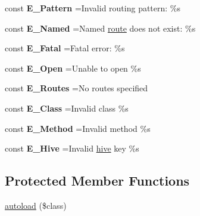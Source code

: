 {\bf }\par
\begin{DoxyCompactItemize}
\item 
\hypertarget{class_base_a2a8c25f4fb29d11d273ea8b7cc678a10}{}\label{class_base_a2a8c25f4fb29d11d273ea8b7cc678a10} 
const {\bfseries E\+\_\+\+Pattern} =\textquotesingle{}Invalid routing pattern\+: \%s\textquotesingle{}
\item 
\hypertarget{class_base_ab7eb7301d76ada1832c7dfd106ee7413}{}\label{class_base_ab7eb7301d76ada1832c7dfd106ee7413} 
const {\bfseries E\+\_\+\+Named} =\textquotesingle{}Named \hyperlink{class_base_a369026a3cb8f321eadc19535ee308b2d}{route} does not exist\+: \%s\textquotesingle{}
\item 
\hypertarget{class_base_a317619c968fa68a4a7704384d9f4efda}{}\label{class_base_a317619c968fa68a4a7704384d9f4efda} 
const {\bfseries E\+\_\+\+Fatal} =\textquotesingle{}Fatal error\+: \%s\textquotesingle{}
\item 
\hypertarget{class_base_a0bbe3ee05726cd755830674390571869}{}\label{class_base_a0bbe3ee05726cd755830674390571869} 
const {\bfseries E\+\_\+\+Open} =\textquotesingle{}Unable to open \%s\textquotesingle{}
\item 
\hypertarget{class_base_a0a15c5ad9084c1fd577c494e4b1d4b52}{}\label{class_base_a0a15c5ad9084c1fd577c494e4b1d4b52} 
const {\bfseries E\+\_\+\+Routes} =\textquotesingle{}No routes specified\textquotesingle{}
\item 
\hypertarget{class_base_a98d5554d5113e4daf97d5496887942dd}{}\label{class_base_a98d5554d5113e4daf97d5496887942dd} 
const {\bfseries E\+\_\+\+Class} =\textquotesingle{}Invalid class \%s\textquotesingle{}
\item 
\hypertarget{class_base_a095176974668a9554e3e88442ba21baa}{}\label{class_base_a095176974668a9554e3e88442ba21baa} 
const {\bfseries E\+\_\+\+Method} =\textquotesingle{}Invalid method \%s\textquotesingle{}
\item 
\hypertarget{class_base_aa0fc170fc7e191b7d16baccde8eea996}{}\label{class_base_aa0fc170fc7e191b7d16baccde8eea996} 
const {\bfseries E\+\_\+\+Hive} =\textquotesingle{}Invalid \hyperlink{class_base_a9492bc2587be1faa2fa7e69d2a89a53e}{hive} key \%s\textquotesingle{}
\end{DoxyCompactItemize}

\subsection*{Protected Member Functions}
\begin{DoxyCompactItemize}
\item 
\hyperlink{class_base_aad6cfb5484c7eda55731134910c7a280}{autoload} (\$class)
\end{DoxyCompactItemize}
